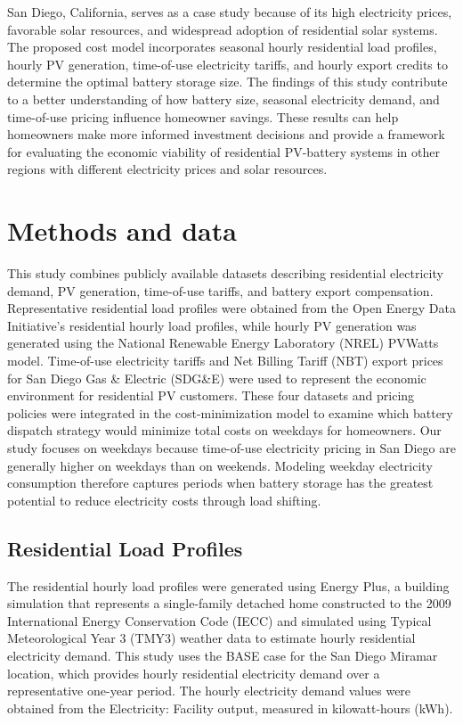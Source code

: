 \documentclass[14pt, final,numbered]{ifacconf}
\begin{document}
San Diego, California, serves as a case study because of its high electricity prices, favorable solar resources, and widespread adoption of residential solar systems. The proposed cost model incorporates seasonal hourly residential load profiles, hourly PV generation, time-of-use electricity tariffs, and hourly export credits to determine the optimal battery storage size. The findings of this study contribute to a better understanding of how battery size, seasonal electricity demand, and time-of-use pricing influence homeowner savings. These results can help homeowners make more informed investment decisions and provide a framework for evaluating the economic viability of residential PV-battery systems in other regions with different electricity prices and solar resources.

\section{Methods and data}
This study combines publicly available datasets describing residential electricity demand, PV generation, time-of-use tariffs, and battery export compensation. Representative residential load profiles were obtained from the Open Energy Data Initiative's residential hourly load profiles, while hourly PV generation was generated using the National Renewable Energy Laboratory (NREL) PVWatts model. Time-of-use electricity tariffs and Net Billing Tariff (NBT) export prices for San Diego Gas \& Electric (SDG\&E) were used to represent the economic environment for residential PV customers. These four datasets and pricing policies were integrated in the cost-minimization model to examine which battery dispatch strategy would minimize total costs on weekdays for homeowners. Our study focuses on weekdays because time-of-use electricity pricing in San Diego are generally higher on weekdays than on weekends. Modeling weekday electricity consumption therefore captures periods when battery storage has the greatest potential to reduce electricity costs through load shifting.

\subsection{Residential Load Profiles}
The residential hourly load profiles were generated using Energy Plus, a building simulation that represents a single-family detached home constructed to the 2009 International Energy Conservation Code (IECC) and simulated using Typical Meteorological Year 3 (TMY3) weather data to estimate hourly residential electricity demand. This study uses the BASE case for the San Diego Miramar location, which provides hourly residential electricity demand over a representative one-year period. The hourly electricity demand values were obtained from the Electricity: Facility output, measured in kilowatt-hours (kWh). 
\end{document}
